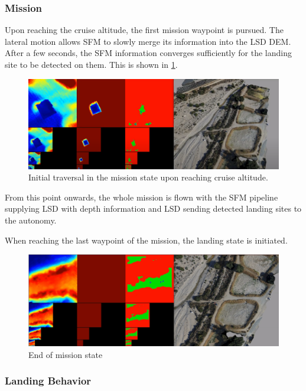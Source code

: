 \subsubsection{Mission}

Upon reaching the cruise altitude, the first mission waypoint is pursued. The lateral motion allows SFM to slowly merge its information into the LSD DEM. After a few seconds, the SFM information converges sufficiently for the landing site to be detected on them. This is shown in \cref{fig:demo_mission1}.

\begin{figure}[h]
\centering
\includegraphics[scale=0.25]{images/autonomous_landing/demo_flight/mission1.png}
\caption{Initial traversal in the mission state upon reaching cruise altitude.}
\label{fig:demo_mission1}
\end{figure}

From this point onwards, the whole mission is flown with the SFM pipeline supplying LSD with depth information and LSD sending detected landing sites to the autonomy.

When reaching the last waypoint of the mission, the landing state is initiated. 

\begin{figure}[h]
\centering
\includegraphics[scale=0.25]{images/autonomous_landing/demo_flight/mission_end.png}
\caption{End of mission state}
\label{fig:demo_mission_end}
\end{figure}

\subsubsection{Landing Behavior}

